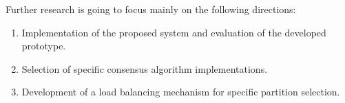 \documentclass[10pt]{llncs}
\begin{document}
Further research is going to focus mainly on the following directions:

\begin{enumerate}
    \item Implementation of the proposed system and evaluation of the developed prototype.
    \item Selection of specific consensus algorithm implementations.
    \item Development of a load balancing mechanism for specific partition selection.
\end{enumerate}



\end{document}
